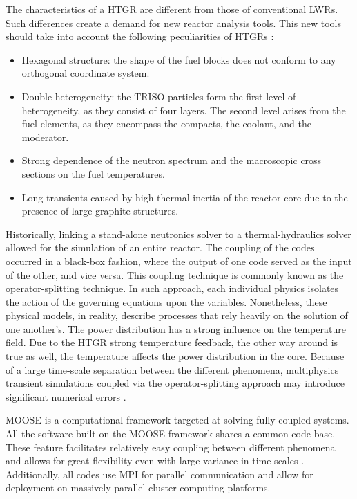 \documentclass[11pt,letterpaper]{article}
\begin{document}
The characteristics of a \gls{HTGR} are different from those of conventional \glspl{LWR}.
Such differences create a demand for new reactor analysis tools.
This new tools should take into account the following peculiarities of \glspl{HTGR} \cite{rohde_development_2012}\cite{bostelmann_criticality_2016}:
\begin{itemize}
\item Hexagonal structure: the shape of the fuel blocks does not conform to any orthogonal coordinate system.
\item Double heterogeneity: the TRISO particles form the first level of heterogeneity, as they consist of four layers. The second level arises from the fuel elements, as they encompass the compacts, the coolant, and the moderator.
\item Strong dependence of the neutron spectrum and the macroscopic cross sections on the fuel temperatures.
\item Long transients caused by high thermal inertia of the reactor core due to the presence of large graphite structures.
\end{itemize}

Historically, linking a stand-alone neutronics solver to a thermal-hydraulics solver allowed for the simulation of an entire reactor.
The coupling of the codes occurred in a black-box fashion, where the output of one code served as the input of the other, and vice versa.
This coupling technique is commonly known as the operator-splitting technique.
In such approach, each individual physics isolates the action of the governing equations upon the variables.
Nonetheless, these physical models, in reality, describe processes that rely heavily on the
solution of one another’s.
The power distribution has a strong influence on the temperature field.
Due to the \gls{HTGR} strong temperature feedback, the other way around is true as well, the temperature affects the power distribution in the core.
Because of a large time-scale separation between the different phenomena, multiphysics transient simulations coupled via the operator-splitting approach may introduce significant numerical errors  \cite{ragusa_consistent_2009} \cite{park_tightly_2010}.

\gls{MOOSE} \cite{gaston_moose_2009} is a computational framework targeted at solving fully coupled systems.
All the software built on the \gls{MOOSE} framework shares a common code base.
These feature facilitates relatively easy coupling between different phenomena and allows for great flexibility even with large variance in time scales \cite{novak_pronghorn_2018}.
Additionally, all codes use MPI for parallel communication and allow for deployment on massively-parallel cluster-computing platforms.
\end{document}
